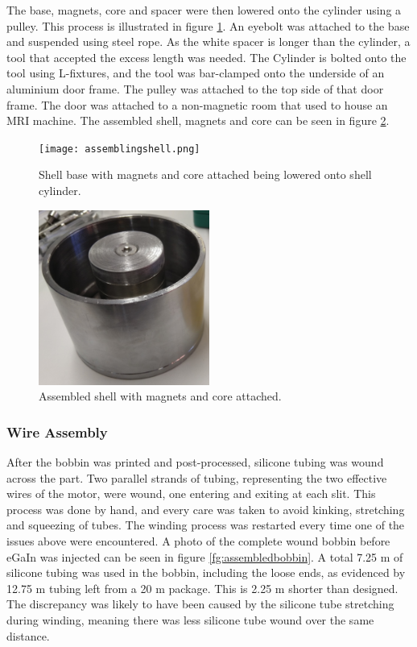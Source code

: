 \documentclass[a4paper,12pt]{article}
\begin{document}
The base, magnets, core and spacer were then lowered onto the cylinder using a pulley. This process is illustrated in figure \ref{fg:assemblingshell}. An eyebolt was attached to the base and suspended using steel rope. As the white spacer is longer than the cylinder, a tool that accepted the excess length was needed. The Cylinder is bolted onto the tool using L-fixtures, and the tool was bar-clamped onto the underside of an aluminium door frame. The pulley was attached to the top side of that door frame. The door was attached to a non-magnetic room that used to house an MRI machine. The assembled shell, magnets and core can be seen in figure \ref{fg:assembledshell}.

\begin{figure}[h!]
    \centering
    \texttt{[image: assemblingshell.png]}
    \caption{Shell base with magnets and core attached being lowered onto shell cylinder.}
    \label{fg:assemblingshell}
\end{figure}

\begin{figure}[h!]
    \centering
    \includegraphics[width=0.5\textwidth]{assembledshell.jpg}
    \caption{Assembled shell with magnets and core attached.}
    \label{fg:assembledshell}
\end{figure}

\subsubsection{Wire Assembly}

After the bobbin was printed and post-processed, silicone tubing was wound across the part. Two parallel strands of tubing, representing the two effective wires of the motor, were wound, one entering and exiting at each slit. This process was done by hand, and every care was taken to avoid kinking, stretching and squeezing of tubes. The winding process was restarted every time one of the issues above were encountered. A photo of the complete wound bobbin before eGaIn was injected can be seen in figure \ref{fg:assembledbobbin}. A total 7.25 m of silicone tubing was used in the bobbin, including the loose ends, as evidenced by 12.75 m tubing left from a 20 m package. This is 2.25 m shorter than designed. The discrepancy was likely to have been caused by the silicone tube stretching during winding, meaning there was less silicone tube wound over the same distance.
\end{document}
